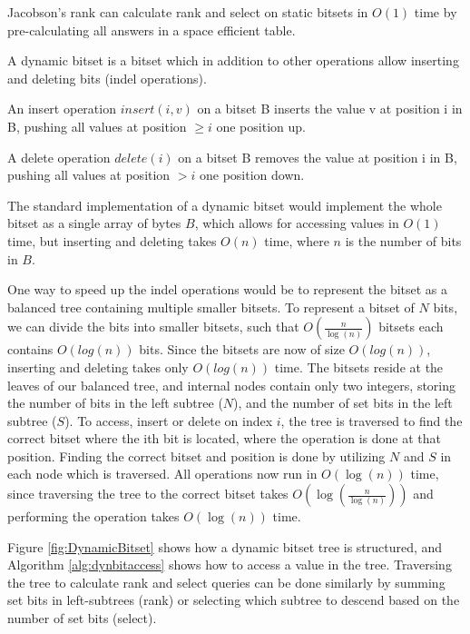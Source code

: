 Jacobson's rank can calculate rank and select on static bitsets in $O(1)$ time by
pre-calculating all answers in a space efficient table.

\begin{definition}
    A dynamic bitset is a bitset which in addition to other operations allow inserting and
    deleting bits (indel operations).

    An insert operation $insert(i, v)$ on a bitset B inserts the value v at position i in
    B, pushing all values at position $\geq i$ one position up.

    A delete operation $delete(i)$ on a bitset B removes the value at position i in B, pushing all
    values at position $> i$ one position down.
\end{definition}

The standard implementation of a dynamic bitset would implement the whole bitset as a
single array of bytes $B$, which allows for accessing values in $O(1)$ time, but inserting
and deleting takes $O(n)$ time, where $n$ is the number of bits in $B$.

One way to speed up the indel operations would be to represent the bitset as a balanced
tree containing multiple smaller bitsets. To represent a bitset of $N$ bits, we can divide
the bits into smaller bitsets, such that $O(\frac{n}{\log(n)})$ bitsets each contains
$O(log(n))$ bits. Since the bitsets are now of size $O(log(n))$, inserting and
deleting takes only $O(log(n))$ time. The bitsets reside at the leaves of our balanced
tree, and internal nodes contain only two integers, storing the number of bits in the left
subtree ($N$), and the number of set bits in the left subtree ($S$). To access, insert or
delete on index $i$, the tree is traversed to find the correct bitset where the ith bit is
located, where the operation is done at that position. Finding the correct bitset and
position is done by utilizing $N$ and $S$ in each node which is traversed. All operations
now run in $O(\log(n))$ time, since traversing the tree to the correct bitset takes
$O(\log(\frac{n}{\log(n)}))$ and performing the operation takes $O(\log(n))$ time.


Figure \ref{fig:DynamicBitset} shows how a dynamic bitset tree is structured, and Algorithm
\ref{alg:dynbitaccess} shows how to access a value in the tree. Traversing the
tree to calculate rank and select queries can be done similarly by summing set
bits in left-subtrees (rank) or selecting which subtree to descend based on the number of
set bits (select).



